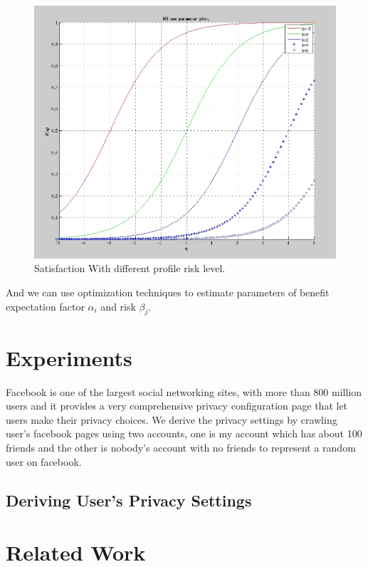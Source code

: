 \documentclass[a4paper]{article}
\begin{document}
\begin{figure}[H]
  \centering
  \includegraphics[width=.7\textwidth]{IRT-b.jpg}
  \caption{Satisfaction With different profile risk level.}
  \label{fig:irtb}
\end{figure}

And we can use optimization techniques to estimate parameters of
benefit expectation factor $\alpha_i$ and risk $\beta_j$.

\section{Experiments}
Facebook is one of the largest social networking sites, with more than
800 million users\cite{facebookwiki} and it provides a very
comprehensive privacy configuration page that let users make their
privacy choices. We derive the privacy settings by crawling user's
facebook pages using two accounts, one is my account which has about 100
friends and the other is nobody's account with no friends to represent
a random user on facebook.

\subsection{Deriving User's Privacy Settings}


\section{Related Work}
\end{document}
